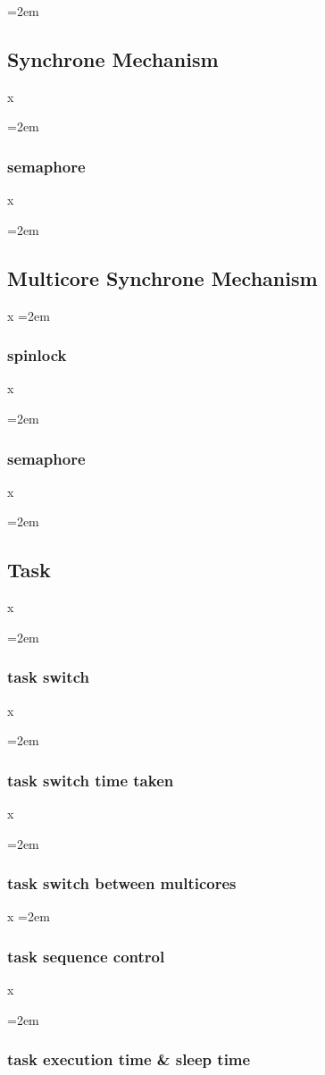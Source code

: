 \documentclass[a4paper]{article}
\let\oldsubsection\subsection
\renewcommand{\subsection}{\leftskip=2em \oldsubsection}
\let\oldsubsubsection\subsubsection
\renewcommand{\subsubsection}{\leftskip=2em \oldsubsubsection}
\begin{document}
\subsection{Synchrone Mechanism}
x

\subsubsection{semaphore}
x

\subsection{Multicore Synchrone Mechanism}

x
\subsubsection{spinlock}
x

\subsubsection{semaphore}
x

\subsection{Task}
x

\subsubsection{task switch}
x

\subsubsection{task switch time taken}
x

\subsubsection{task switch between multicores}

x
\subsubsection{task sequence control}
x

\subsubsection{task execution time \& sleep time}
\end{document}

